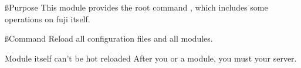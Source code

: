 
\ss{Purpose}
This module provides the root command , which includes some operations on fuji itself.

\ss{Command}
Reload all configuration files and all modules.

\begin{note}{Module itself can't be hot reloaded}
    After you  or  a module, you must  your server.
\end{note}


